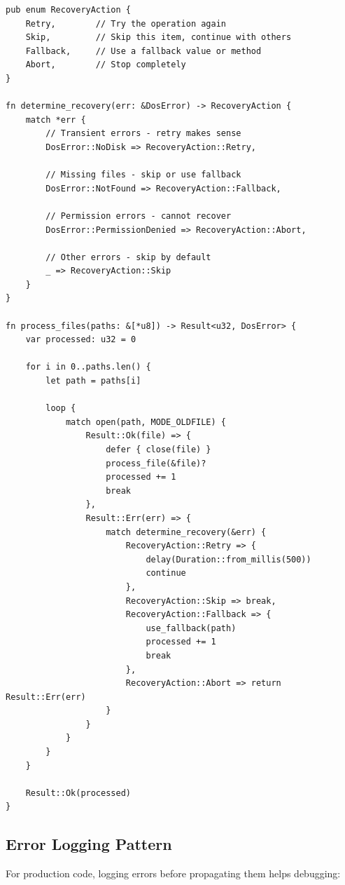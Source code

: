 \begin{lstlisting}
pub enum RecoveryAction {
    Retry,        // Try the operation again
    Skip,         // Skip this item, continue with others
    Fallback,     // Use a fallback value or method
    Abort,        // Stop completely
}

fn determine_recovery(err: &DosError) -> RecoveryAction {
    match *err {
        // Transient errors - retry makes sense
        DosError::NoDisk => RecoveryAction::Retry,

        // Missing files - skip or use fallback
        DosError::NotFound => RecoveryAction::Fallback,

        // Permission errors - cannot recover
        DosError::PermissionDenied => RecoveryAction::Abort,

        // Other errors - skip by default
        _ => RecoveryAction::Skip
    }
}

fn process_files(paths: &[*u8]) -> Result<u32, DosError> {
    var processed: u32 = 0

    for i in 0..paths.len() {
        let path = paths[i]

        loop {
            match open(path, MODE_OLDFILE) {
                Result::Ok(file) => {
                    defer { close(file) }
                    process_file(&file)?
                    processed += 1
                    break
                },
                Result::Err(err) => {
                    match determine_recovery(&err) {
                        RecoveryAction::Retry => {
                            delay(Duration::from_millis(500))
                            continue
                        },
                        RecoveryAction::Skip => break,
                        RecoveryAction::Fallback => {
                            use_fallback(path)
                            processed += 1
                            break
                        },
                        RecoveryAction::Abort => return Result::Err(err)
                    }
                }
            }
        }
    }

    Result::Ok(processed)
}
\end{lstlisting}

\subsection{Error Logging Pattern}

For production code, logging errors before propagating them helps debugging:

